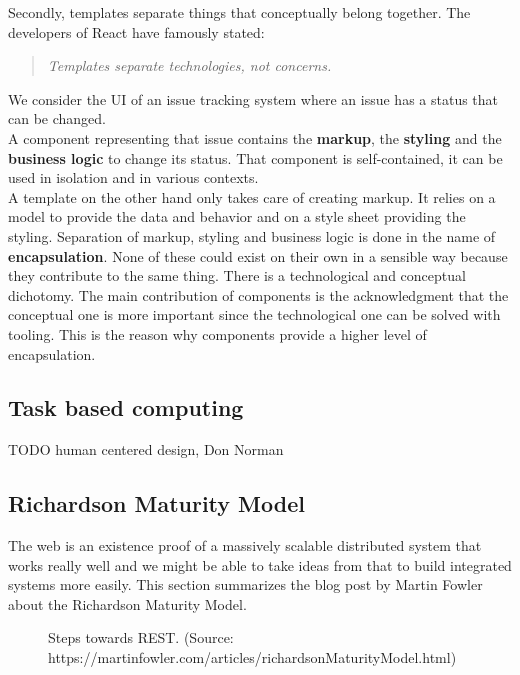 Secondly, templates separate things that conceptually belong together. The developers of React have famously stated:
\begin{quote}
\textit{Templates separate technologies, not concerns.}
\end{quote}
We consider the UI of an issue tracking system where an issue has a status that can be changed. \\ A component representing that issue contains the \textbf{markup}, the \textbf{styling} and the \textbf{business logic} to change its status. That component is self-contained, it can be used in isolation and in various contexts. \\
A template on the other hand only takes care of creating markup. It relies on a model to provide the data and behavior and on a style sheet providing the styling.
Separation of markup, styling and business logic is done in the name of \textbf{encapsulation}. None of these could exist on their own in a sensible way because they contribute to the same thing. There is a technological and conceptual dichotomy. The main contribution of components is the acknowledgment that the conceptual one is more important since the technological one can be solved with tooling. This is the reason why components provide a higher level of encapsulation.

\subsection{Task based computing}

TODO human centered design, Don Norman

\subsection{Richardson Maturity Model}\label{richardsonmaturitymodel}

The web is an existence proof of a massively scalable distributed system that works really well and we might be able to take ideas from that to build integrated systems more easily. \citep{richardsonmaturitymodel} This section summarizes the blog post by Martin Fowler about the Richardson Maturity Model.

\begin{figure}[!htb]
  \caption{Steps towards REST. (Source: https://martinfowler.com/articles/richardsonMaturityModel.html)}
\end{figure}

